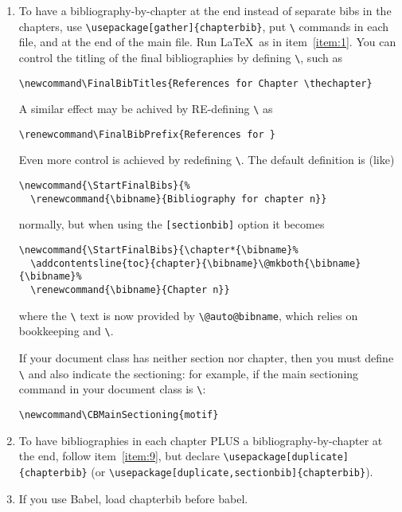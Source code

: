 \documentclass[DIV=9, pagesize=auto]{scrartcl}
\makeatletter
\newcommand*{\pkg}[1]{\textsf{#1}}
\newcommand*{\cs}[1]{\texttt{\textbackslash#1}}
\newcommand*{\cmd}[1]{\cs{\expandafter\@gobble\string#1}}
\makeatother
\begin{document}
\begin{enumerate}
\item \label{item:8} To have a bibliography-by-chapter at the end instead of separate bibs
  in the chapters, use \verb+\usepackage[gather]{chapterbib}+, put \cmd{}
  commands in each file, and at the end of the main file. Run \LaTeX\ as
  in item~\ref{item:1}. You can control the titling of the final bibliographies by
  defining \cmd{\FinalBibTitles}, such as
\begin{lstlisting}
\newcommand\FinalBibTitles{References for Chapter \thechapter}
\end{lstlisting}
  A similar effect may be achived by RE-defining \cmd{\FinalBibPrefix} as
\begin{lstlisting}
\renewcommand\FinalBibPrefix{References for }
\end{lstlisting}
  Even more control is achieved by redefining \cmd{\StartFinalBibs}.
  The default definition is (like)
\begin{lstlisting}
\newcommand{\StartFinalBibs}{%
  \renewcommand{\bibname}{Bibliography for chapter n}}
\end{lstlisting}
  normally, but when using the \texttt{[sectionbib]} option it becomes
\begin{lstlisting}
\newcommand{\StartFinalBibs}{\chapter*{\bibname}%
  \addcontentsline{toc}{chapter}{\bibname}\@mkboth{\bibname}{\bibname}%
  \renewcommand{\bibname}{Chapter n}}
\end{lstlisting}
  where the \cmd{\bibname} text is now provided by \verb+\@auto@bibname+, which 
  relies on bookkeeping and \cmd{\FinalBibPrefix}. 

  If your document class has neither section nor chapter, then you must
  define \cmd{\StartFinalBibs} and also indicate the sectioning: for example,
  if the main sectioning command in your document class is \cmd{\motif}:
\begin{lstlisting}
\newcommand\CBMainSectioning{motif}
\end{lstlisting}

\item \label{item:9} To have bibliographies in each chapter PLUS a bibliography-by-chapter at
  the end, follow item~\ref{item:9}, but declare \verb+\usepackage[duplicate]{chapterbib}+
  (or \verb+\usepackage[duplicate,sectionbib]{chapterbib}+).

\item If you use Babel, load \pkg{chapterbib} before \pkg{babel}.
\end{enumerate}
\end{document}
